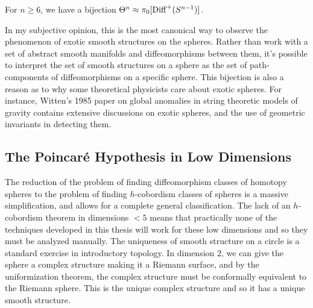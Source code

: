 	\begin{proposition}
		For $n\geq 6$, we have a bijection $\Theta^n \approx \pi_0[{\operatorname{Diff}}^+(S^{n-1})]$.
	\end{proposition}

	In my subjective opinion, this is the most canonical way to observe the phenomenon of exotic smooth structures on the spheres. Rather than work with a set of abstract smooth manifolds and diffeomorphisms between them, it's possible to interpret the set of smooth structures on a sphere as the set of path-components of diffeomorphisms on a specific sphere. This bijection is also a reason as to why some theoretical physicists care about exotic spheres.  
	For instance, Witten's 1985 paper \cite{witten1985global} on global anomalies in string theoretic models of gravity contains extensive discussions on exotic spheres, and the use of geometric invariants in detecting them.

\subsection{The Poincar\'e Hypothesis in Low Dimensions}

The reduction of the problem of finding diffeomorphism classes of homotopy spheres to the problem of finding $h$-cobordism classes of spheres is a massive simplification, and allows for a complete general classification.
The lack of an $h$-cobordism theorem in dimensions $<5$ means that practically none of the techniques developed in this thesis will work for these low dimensions and so they must be analyzed manually. The uniqueness of smooth structure on a circle is a standard exercise in introductory topology. In dimension $2$, we can give the sphere a complex structure making it a Riemann surface, and by the uniformization theorem, the complex structure must be conformally equivalent to the Riemann sphere. This is the unique complex structure and so it has a unique smooth structure.

